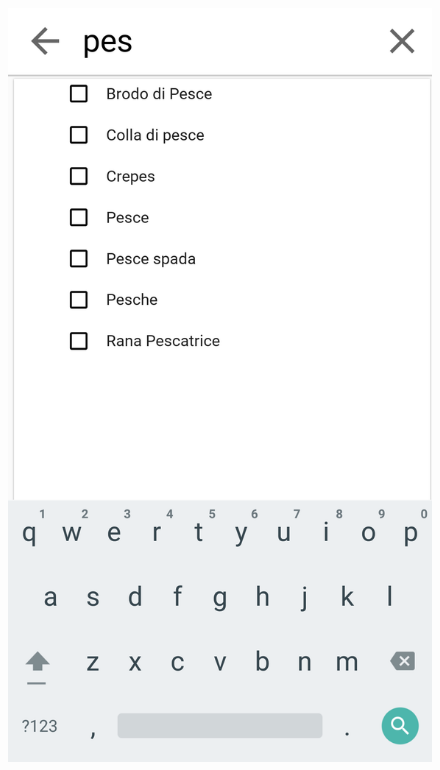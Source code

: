 \begin{figure}[H]
\begin{minipage}{.49\textwidth}
		\includegraphics[width=\textwidth]{img/wireframe/search_page_esclusione_cerca.png}
	\end{minipage}
\end{figure}
